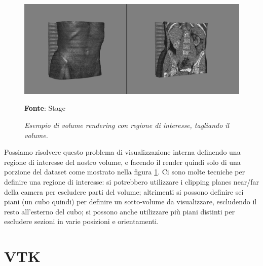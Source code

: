 \begin{figure}[h]
    \centering
    \includegraphics[scale=0.3]{immagini/volumerendering/regionofinterest.png}
    \caption{\textit{Esempio di volume rendering con regione di interesse, tagliando il volume.}}
    \textbf{Fonte}: Stage
    \label{fig: Volume Rendering con Regione di Interesse}
\end{figure}

Possiamo risolvere questo problema di visualizzazione interna definendo una regione di interesse del nostro volume, e facendo il render quindi solo di una porzione del dataset come mostrato nella figura \ref{fig: Volume Rendering con Regione di Interesse}. Ci sono molte tecniche per definire una regione di interesse: si potrebbero utilizzare i clipping planes near/far della camera per escludere parti del volume; altrimenti si possono definire sei piani (un cubo quindi) per definire un sotto-volume da visualizzare, escludendo il resto all'esterno del cubo; si possono anche utilizzare più piani distinti per escludere sezioni in varie posizioni e orientamenti.

\section{VTK}

